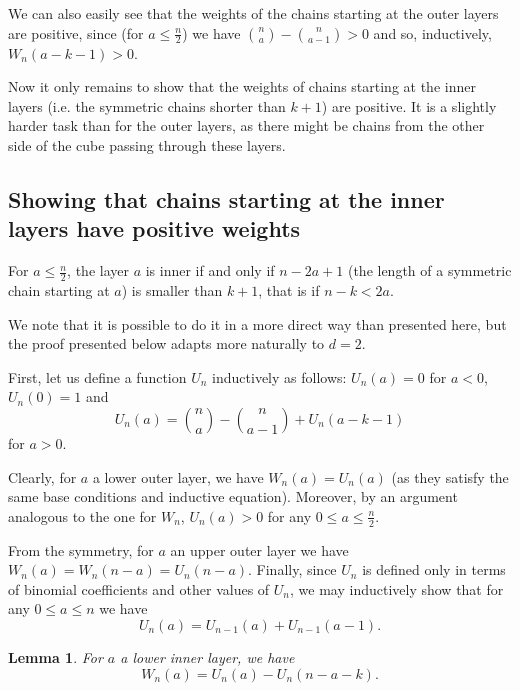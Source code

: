 \documentclass[11pt, reqno]{amsart}
\newcommand{\leanblueprintbase}{https://mj141592.github.io/weighted-chains-paper}
\newif\ifleanlinks
\newcommand{\leanblueprint}[1]{%
  \ifleanlinks
    \leavevmode\unskip\penalty9999\hbox{}\nobreak\hfill\quad
    \href{\leanblueprintbase/theorems/#1/}{%
      \mbox{\normalfont\footnotesize\textcolor{blue}{[\textsf{Lean formalisation}]}}}%
    \par\nobreak
  \fi
}
\newtheorem{lemma}[theorem]{Lemma}
\theoremstyle{remark}
\numberwithin{equation}{section}
\newcommand{\uno}{U_{n-1}}
\begin{document}
We can also easily see that the weights of the chains starting at the outer layers are positive, since (for $a \leqslant \frac{n}{2}$) we have $\binom{n}{a}-\binom{n}{a-1}>0$ and so, inductively, $W_n(a-k-1) > 0$.

Now it only remains to show that the weights of chains starting at the inner layers (i.e. the symmetric chains shorter than $k+1$) are positive. It is a slightly harder task than for the outer layers, as there might be chains from the other side of the cube passing through these layers.

\subsection{Showing that chains starting at the inner layers have positive weights}

For $a \leqslant \frac{n}{2}$, the layer $a$ is inner if and only if $n-2a+1$ (the length of a symmetric chain starting at $a$) is smaller than $k+1$, that is if $n-k<2a$.

We note that it is possible to do it in a more direct way than presented here, but the proof presented below adapts more naturally to $d=2$. 

First, let us define a function $U_n$ inductively as follows:
$U_n(a)=0$ for $a<0$, $U_n(0)=1$ and
\begin{equation}
    U_n(a) = \binom{n}{a} - \binom{n}{a-1} + U_n(a-k-1)
\end{equation}
for $a>0$.

Clearly, for $a$ a lower outer layer, we have $W_n(a)=U_n(a)$ (as they satisfy the same base conditions and inductive equation). Moreover, by an argument analogous to the one for $W_n$, $U_n(a)>0$ for any $0 \leqslant a \leqslant \frac{n}{2}$.

From the symmetry, for $a$ an upper outer layer we have $W_n(a)=W_n(n-a)=U_n(n-a)$. Finally, since $U_n$ is defined only in terms of binomial coefficients and other values of $U_n$, we may inductively show that for any $0 \leqslant a \leqslant n$ we have
\begin{equation}
    U_n(a)=\uno(a)+\uno(a-1).
\end{equation}

\begin{lemma}
\label{wc:lem:boolean-inner-weight}
     For $a$ a lower inner layer, we have
    \begin{equation}
        W_n(a)=U_n(a) - U_n(n-a-k).
    \end{equation}
\leanblueprint{boolean-inner-weight}
\end{lemma}
\end{document}
